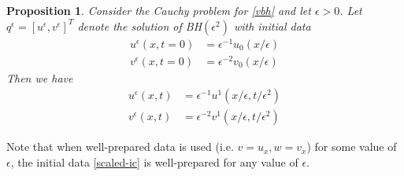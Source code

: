 \documentclass{article}
\theoremstyle{plain}
\newtheorem{proposition}[theorem]{Proposition}
\theoremstyle{definition}
\numberwithin{theorem}{section}
\begin{document}
\begin{proposition}\label{prop:vbh-scaling}
Consider the Cauchy problem for \eqref{vbh} and let $\epsilon>0$.
Let $q^\epsilon=[u^\epsilon,v^\epsilon]^T$ denote the
solution of BH$(\epsilon^2)$ with initial data
\begin{subequations} \label{bh-scaled-ic}
\begin{align}
    u^\epsilon(x,t=0) & = \epsilon^{-1} u_0(x/\epsilon) \\
    v^\epsilon(x,t=0) & = \epsilon^{-2} v_0(x/\epsilon)
\end{align}
\end{subequations}
Then we have
\begin{subequations} \label{bh-scaled-ic-2}
\begin{align}
    u^{\epsilon}(x,t) & = \epsilon^{-1} u^1(x/\epsilon, t/\epsilon^2) \\
    v^{\epsilon}(x,t) & = \epsilon^{-2} v^1(x/\epsilon, t/\epsilon^2)
\end{align}
\end{subequations}
\end{proposition}
Note that when well-prepared data is used (i.e. $v=u_x, w = v_x$) for some value of
$\epsilon$, the initial data \eqref{scaled-ic} is well-prepared for any value of $\epsilon$.
\end{document}
